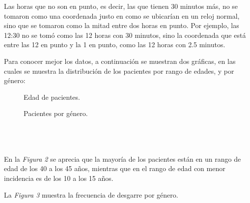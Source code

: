 \documentclass{article}
\begin{document}
Las horas que no son en punto, es decir, las que tienen 30 minutos más, no se tomaron como una coordenada justo en como se ubicarían en un reloj normal, sino que se tomaron como la mitad entre dos horas en punto. Por ejemplo, las 12:30 no se tomó como las 12 horas con 30 minutos, sino la coordenada que está entre las 12 en punto y la 1 en punto, como las 12 horas con 2.5 minutos. 


	Para conocer mejor los datos, a continuación se muestran dos gráficas, en las cuales se muestra la distribución de los pacientes por rango de edades, y por género:
    \ \\
	 \begin{figure}[h!tb]
	 	\centerline{}	
	 	\caption{\label{fig:prueba} Edad de pacientes.}
	 \end{figure}

	 \begin{figure}[h!tb]        %
	 	\centerline{}	
	 	\caption{\label{fig:prueba} Pacientes por género.}
	 \end{figure}
	 
	\ \\ \ \\ \ \\ 
	En la \textit{Figura 2} se aprecia que la mayoría de los pacientes están en un rango de edad de los 40 a los 45 años, mientras que en el rango de edad con menor incidencia es de los 10 a los 15 años.
	
	La \textit{Figura 3} muestra la frecuencia de desgarre por género. %
	
	 
\end{document}
